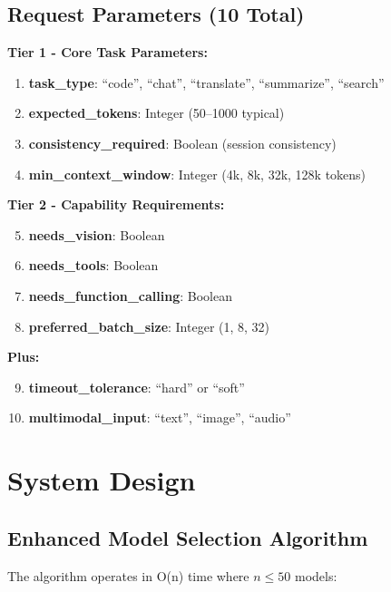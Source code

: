 \documentclass[11pt]{article}
\begin{document}
\subsection{Request Parameters (10 Total)}

\textbf{Tier 1 - Core Task Parameters:}
\begin{enumerate}
    \item \textbf{task\_type}: ``code'', ``chat'', ``translate'', ``summarize'', ``search''
    \item \textbf{expected\_tokens}: Integer (50--1000 typical)
    \item \textbf{consistency\_required}: Boolean (session consistency)
    \item \textbf{min\_context\_window}: Integer (4k, 8k, 32k, 128k tokens)
\end{enumerate}

\textbf{Tier 2 - Capability Requirements:}
\begin{enumerate}
    \setcounter{enumi}{4}
    \item \textbf{needs\_vision}: Boolean
    \item \textbf{needs\_tools}: Boolean
    \item \textbf{needs\_function\_calling}: Boolean
    \item \textbf{preferred\_batch\_size}: Integer (1, 8, 32)
\end{enumerate}

\textbf{Plus:}
\begin{enumerate}
    \setcounter{enumi}{8}
    \item \textbf{timeout\_tolerance}: ``hard'' or ``soft''
    \item \textbf{multimodal\_input}: ``text'', ``image'', ``audio''
\end{enumerate}

\section{System Design}

\subsection{Enhanced Model Selection Algorithm}

The algorithm operates in O(n) time where $n \leq 50$ models:
\end{document}
